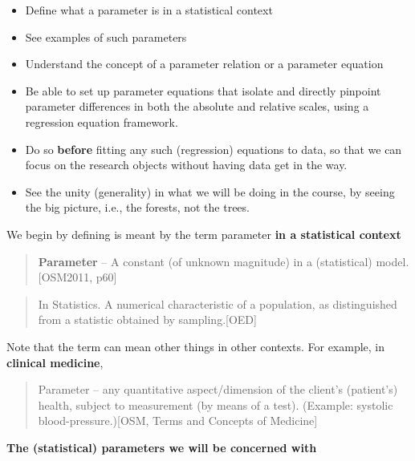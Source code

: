 \documentclass[]{book}
\begin{document}
\begin{itemize}
\item
  Define what a parameter is in a statistical context
\item
  See examples of such parameters
\item
  Understand the concept of a parameter relation or a parameter equation
\item
  Be able to set up parameter equations that isolate and directly pinpoint parameter differences in both the absolute and relative scales, using a regression equation framework.
\item
  Do so \textbf{before} fitting any such (regression) equations to data, so that we can focus on the research objects without having data get in the way.
\item
  See the unity (generality) in what we will be doing in the course, by seeing the big picture, i.e., the forests, not the trees.
\end{itemize}

We begin by defining is meant by the term parameter \textbf{in a statistical context}

\begin{quote}
\textbf{Parameter} -- A constant (of unknown magnitude) in a (statistical) model. {[}OSM2011, p60{]}
\end{quote}

\begin{quote}
In Statistics. A numerical characteristic of a population, as distinguished from a statistic obtained by sampling.{[}OED{]}
\end{quote}

Note that the term can mean other things in other contexts. For example, in \textbf{clinical medicine},

\begin{quote}
Parameter -- any quantitative aspect/dimension of the client's (patient's) health, subject to measurement (by means of a test). (Example: systolic blood-pressure.){[}OSM, Terms and Concepts of Medicine{]}
\end{quote}

\textbf{The (statistical) parameters we will be concerned with}
\end{document}

